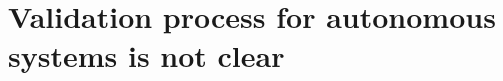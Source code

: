 \documentclass[sigconf,review, anonymous]{acmart}
\begin{document}
    
    



			
\section{Validation process for autonomous systems is not clear}\label{sec:approach} 
\end{document}
